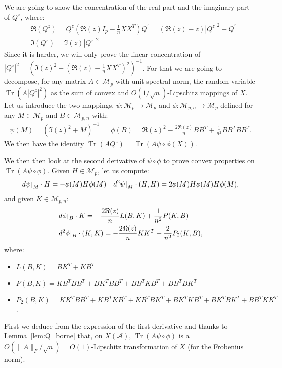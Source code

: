\documentclass{ws-rmta}
\DeclareMathOperator{\tr}{Tr}
\def\restriction#1#2{\mathchoice
              {\setbox1\hbox{${\displaystyle #1}_{\scriptstyle #2}$}
              \restrictionaux{#1}{#2}}
              {\setbox1\hbox{${\textstyle #1}_{\scriptstyle #2}$}
              \restrictionaux{#1}{#2}}
              {\setbox1\hbox{${\scriptstyle #1}_{\scriptscriptstyle #2}$}
              \restrictionaux{#1}{#2}}
              {\setbox1\hbox{${\scriptscriptstyle #1}_{\scriptscriptstyle #2}$}
              \restrictionaux{#1}{#2}}}
\def\restrictionaux#1#2{{#1\,\smash{\vrule height .8\ht1 depth .85\dp1}}_{\,#2}}
\begin{document}
  We are going to show the concentration of the real part and the imaginary part of $Q^z$, where:
  \begin{align*}
    &\Re(Q^z) = Q^z \left(\Re(z) I_p - \frac{1}{n}XX^T\right)\bar{Q}^z =(\Re(z)-z) |Q^z|^2 + \bar{Q}^z \\
    &\Im(Q^z) = \Im(z) |Q^z|^2
  \end{align*}
  Since it is harder, we will only prove the linear concentration of $|Q^z|^2 = (\Im(z)^2 + (\Re(z) - \frac{1}{n}XX^T)^2)^{-1}$. For that we are going to decompose, for any matrix $A \in \mathcal M_{p}$ with unit spectral norm, the random variable $\tr(A|Q^z|^2)$ as the sum of convex and $O(1/\sqrt n)$-Lipschitz mappings of $X$. Let us introduce the two mappings, $\psi : \mathcal M_{p} \to \mathcal M_{p}$ and $\phi : \mathcal M_{p,n} \to \mathcal M_{p}$ defined for any $M \in \mathcal M_{p}$ and $B \in \mathcal M_{p, n}$ with:
  \begin{align*}
    \psi(M) = (\Im(z)^2 + M)^{-1}&
    &\phi(B) = \Re(z)^2 - \frac{2\Re(z)}{n}BB^T + \frac{1}{n^2}BB^TBB^T.
  \end{align*}
  We then have the identity $\tr(A Q^z) = \tr \left(A\psi\circ\phi \left(X\right)\right)$. 

  We then then look at the second derivative of $\psi\circ\phi$ to prove convex properties on $\tr(A\psi\circ\phi)$.
  Given $H \in \mathcal M_{p}$, let us compute:
  \begin{align*}
    \restriction{d\psi}{M} \cdot H = -\phi(M)H\phi(M)&
    &\restriction{d^2\psi}{M} \cdot (H,H) = 2\phi(M)H\phi(M)H\phi(M),
  \end{align*}
  and given $K \in \mathcal M_{p,n}$:
  \begin{align*}
    &\restriction{d\phi}{B} \cdot K = -\frac{2\Re(z)}{n} L(B,K) + \frac{1}{n^2}P(K,B)\\
    &\restriction{d^2\phi}{B} \cdot (K,K) = -\frac{2\Re(z)}{n} KK^T + \frac{2}{n^2}P_2(K,B),
  \end{align*}
  where:
  \begin{itemize}
    \item $L(B,K) = BK^T +KB^T$
    \item $P(B,K) = KB^TBB^T+ BK^TBB^T + BB^TKB^T + BB^TBK^T$
    \item $P_2(B,K) = KK^TBB^T+ KB^TKB^T + KB^TBK^T+ BK^TKB^T + BK^TBK^T + BB^TKK^T$.
  \end{itemize}
  First we deduce from the expression of the first derivative and thanks to Lemma~\ref{lem:Q_borne} that, on $X(\mathcal A)$, $\tr \left(A\psi\circ\phi \right)$ is a $O(\|A\|_F/\sqrt n) = O(1)$-Lipschitz transformation of $X$ (for the Frobenius norm).
\end{document}
